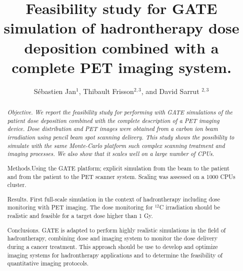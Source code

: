 \documentclass[11pt]{iopart}
\begin{document}
\title[Gate Hadron PET]{Feasibility study for GATE simulation of
  hadrontherapy dose deposition combined with a complete PET imaging
  system.}


\author{S{\'e}bastien Jan$^{1}$, Thibault Frisson$^{2,3}$, and David Sarrut $^{2,3}$}

\address{$^1$ CEA, Service Hospitalier Frédéric Joliot, Orsay, France}
\address{$^2$ University of Lyon, CREATIS-LRMN; CNRS UMR5220; INSA-Lyon, France}
\address{$^3$ University of Lyon, L\'eon B\'erard Cancer Center, F-69373, Lyon, France}

\linenumbers
\begin{abstract}

  {\it Objective. We report the feasibility study for performing with
    GATE simulations of the patient dose deposition combined with the
    complete description of a PET imaging device. Dose distribution
    and PET images were obtained from a carbon ion beam irradiation
    using pencil beam spot scanning delivery. This study shows the
    possibility to simulate with the same Monte-Carlo platform such
    complex scanning treatment and imaging processes. We also show
    that it scales well on a large number of CPUs.

    Methods.Using the GATE platform; explicit simulation from the
    beam to the patient and from the patient to the PET scanner
    system. Scaling was assessed on a 1000 CPUs cluster.

    Results.  First full-scale simulation in the context of
    hadrontherapy including dose monitoring with PET imaging. The dose
    monitoring for $^{12}$C irradiation should be realistic and
    feasible for a target dose higher than 1 Gy.

    Conclusions.  GATE is adapted to perform highly realistic
    simulations in the field of hadrontherapy, combining dose and
    imaging system to monitor the dose delivery during a cancer
    treatment. This approach should be use to develop and optimize
    imaging systems for hadrontherapy applications and to determine
    the feasibility of quantitative imaging protocols. }

\end{abstract}
\end{document}
